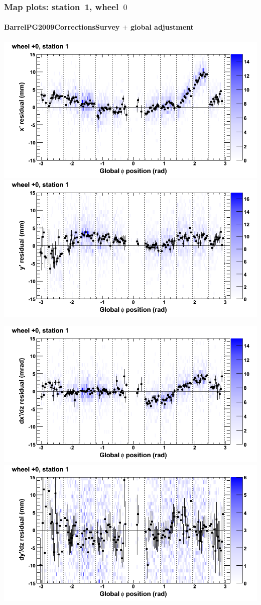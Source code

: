 \documentclass[compress]{beamer}
\begin{document}
\begin{frame}
\frametitle{Map plots: station~1, wheel~$0$}
\framesubtitle{BarrelPG2009CorrectionsSurvey $+$ global adjustment}
\includegraphics[width=0.5\linewidth]{mapplots_re01/DTvsphi_st1whC_x.png}
\includegraphics[width=0.5\linewidth]{mapplots_re01/DTvsphi_st1whC_y.png}

\includegraphics[width=0.5\linewidth]{mapplots_re01/DTvsphi_st1whC_dxdz.png}
\includegraphics[width=0.5\linewidth]{mapplots_re01/DTvsphi_st1whC_dydz.png}
\end{frame}
\end{document}
